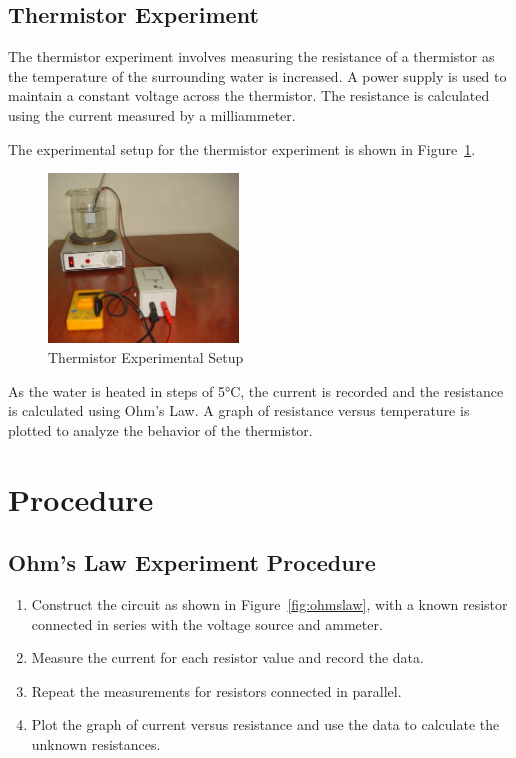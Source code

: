 \documentclass[journal]{IEEEtran}
\begin{document}
\subsection{Thermistor Experiment}
The thermistor experiment involves measuring the resistance of a thermistor as the temperature of the surrounding water is increased. A power supply is used to maintain a constant voltage across the thermistor. The resistance is calculated using the current measured by a milliammeter. 

The experimental setup for the thermistor experiment is shown in Figure~\ref{fig:thermistor}.

\begin{figure}[H]
    \centering
    \includegraphics[width=0.45\textwidth]{IMAGES/Thermistor_Setup.png} %
    \caption{Thermistor Experimental Setup}
    \label{fig:thermistor}
\end{figure}

As the water is heated in steps of 5°C, the current is recorded and the resistance is calculated using Ohm’s Law. A graph of resistance versus temperature is plotted to analyze the behavior of the thermistor.

\section{Procedure}
\subsection{Ohm’s Law Experiment Procedure}
\begin{enumerate}
    \item Construct the circuit as shown in Figure~\ref{fig:ohmslaw}, with a known resistor connected in series with the voltage source and ammeter.
    \item Measure the current for each resistor value and record the data.
    \item Repeat the measurements for resistors connected in parallel.
    \item Plot the graph of current versus resistance and use the data to calculate the unknown resistances.
\end{enumerate}
\end{document}
